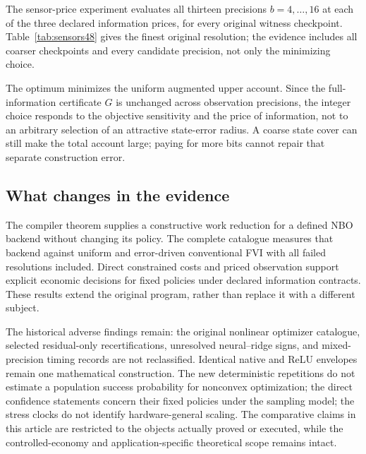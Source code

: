 The sensor-price experiment evaluates all thirteen precisions $b=4,\ldots,16$ at each of the three declared information prices, for every original witness checkpoint. Table~\ref{tab:sensors48} gives the finest original resolution; the evidence includes all coarser checkpoints and every candidate precision, not only the minimizing choice.

The optimum minimizes the uniform augmented upper account. Since the full-information certificate $G$ is unchanged across observation precisions, the integer choice responds to the objective sensitivity and the price of information, not to an arbitrary selection of an attractive state-error radius. A coarse state cover can still make the total account large; paying for more bits cannot repair that separate construction error.

\subsection{What changes in the evidence}
The compiler theorem supplies a constructive work reduction for a defined NBO backend without changing its policy. The complete catalogue measures that backend against uniform and error-driven conventional FVI with all failed resolutions included. Direct constrained costs and priced observation support explicit economic decisions for fixed policies under declared information contracts. These results extend the original program, rather than replace it with a different subject.

The historical adverse findings remain: the original nonlinear optimizer catalogue, selected residual-only recertifications, unresolved neural--ridge signs, and mixed-precision timing records are not reclassified. Identical native and ReLU envelopes remain one mathematical construction. The new deterministic repetitions do not estimate a population success probability for nonconvex optimization; the direct confidence statements concern their fixed policies under the sampling model; the stress clocks do not identify hardware-general scaling. The comparative claims in this article are restricted to the objects actually proved or executed, while the controlled-economy and application-specific theoretical scope remains intact.
